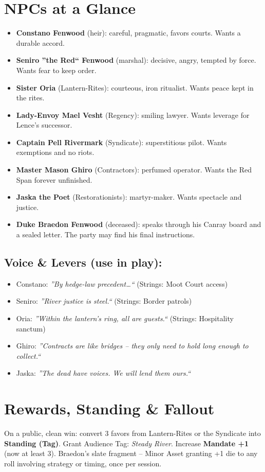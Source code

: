 \documentclass[11pt]{article}
\begin{document}
\section*{NPCs at a Glance}
\begin{itemize}
  \item \textbf{Constano Fenwood} (heir): careful, pragmatic, favors courts. Wants a durable accord.
  \item \textbf{Seniro ''the Red`` Fenwood} (marshal): decisive, angry, tempted by force. Wants fear to keep order.
  \item \textbf{Sister Oria} (Lantern-Rites): courteous, iron ritualist. Wants peace kept in the rites.
  \item \textbf{Lady-Envoy Mael Vesht} (Regency): smiling lawyer. Wants leverage for Lence's successor.
  \item \textbf{Captain Pell Rivermark} (Syndicate): superstitious pilot. Wants exemptions and no riots.
  \item \textbf{Master Mason Ghiro} (Contractors): perfumed operator. Wants the Red Span forever unfinished.
  \item \textbf{Jaska the Poet} (Restorationists): martyr-maker. Wants spectacle and justice.
  \item \textbf{Duke Braedon Fenwood} (deceased): speaks through his Canray board and a sealed letter. The party may find his final instructions.
\end{itemize}

\subsection*{Voice \& Levers (use in play):}
\begin{itemize}
  \item Constano: \textit{''By hedge-law precedent\dots``} (Strings: Moot Court access)
  \item Seniro: \textit{''River justice is steel.``} (Strings: Border patrols)
  \item Oria: \textit{''Within the lantern's ring, all are guests.``} (Strings: Hospitality sanctum)
  \item Ghiro: \textit{''Contracts are like bridges -- they only need to hold long enough to collect.``}
  \item Jaska: \textit{''The dead have voices. We will lend them ours.``}
\end{itemize}

\section*{Rewards, Standing \& Fallout}
On a public, clean win: convert 3 favors from Lantern-Rites or the Syndicate into \textbf{Standing (Tag)}. Grant Audience Tag: \textit{Steady River}. Increase \textbf{Mandate +1} (now at least 3). Braedon's slate fragment -- Minor Asset granting +1 die to any roll involving strategy or timing, once per session.
\end{document}
